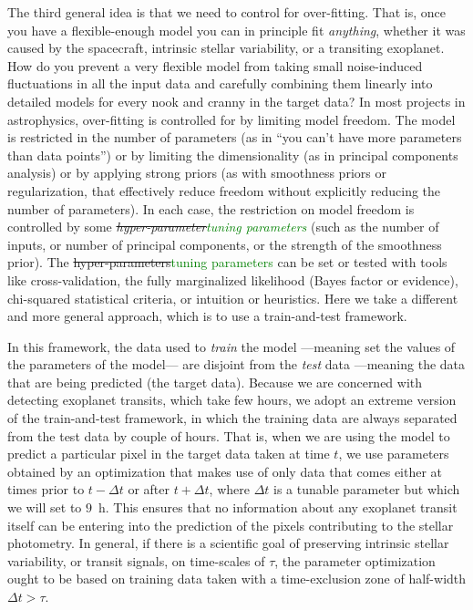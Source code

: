 \documentclass[12pt, preprint]{aastex}
\newcommand{\revise}[1]{\textcolor{green}{#1}}
\newcommand{\remove}[1]{\sout{#1}}
\begin{document}
The third general idea is that we need to control for over-fitting.
That is, once you have a flexible-enough model you can in principle fit \emph{anything},
  whether it was caused by the spacecraft, intrinsic stellar variability, or a transiting exoplanet.
How do you prevent a very flexible model from taking small noise-induced fluctuations in all the input data
  and carefully combining them linearly into detailed models for every nook and cranny in the target data?
In most projects in astrophysics, over-fitting is controlled for by limiting model freedom.
The model is restricted in the number of parameters
  (as in ``you can't have more parameters than data points'')
  or by limiting the dimensionality
  (as in principal components analysis)
  or by applying strong priors
  (as with smoothness priors or regularization, 
  that effectively reduce freedom without explicitly reducing the number of parameters).
In each case, the restriction on model freedom is controlled by some \emph{\remove{hyper-parameter}\revise{tuning parameters}}
  (such as the number of inputs, or number of principal components, or the strength of the smoothness prior).
The \remove{hyper-parameters}\revise{tuning parameters} can be set or tested with tools like cross-validation,
  the fully marginalized likelihood (Bayes factor or evidence),
  chi-squared statistical criteria,
  or intuition or heuristics.
Here we take a different and more general approach, which is to use a train-and-test framework.

In this framework, the data used to \emph{train} the model%
  ---meaning set the values of the parameters of the model---%
  are disjoint from the \emph{test} data
  ---meaning the data that are being predicted (the target data).
Because we are concerned with detecting exoplanet transits,
  which take few hours,
  we adopt an extreme version of the train-and-test framework,
  in which the training data are always separated from the test data by couple of hours.
That is, when we are using the model to predict a particular pixel in the target data taken at time $t$,
  we use parameters obtained by an optimization that makes use of only data
  that comes either at times prior to $t-\Delta t$ or after $t+\Delta t$,
  where $\Delta t$ is a tunable parameter but which we will set to $9$~h.
This ensures that no information about any exoplanet transit itself
  can be entering into the prediction of the pixels contributing to the stellar photometry.
In general, if there is a scientific goal of preserving intrinsic stellar variability,
  or transit signals,
  on time-scales of $\tau$,
  the parameter optimization ought to be based on training data taken with a time-exclusion zone of half-width $\Delta t > \tau$.
\end{document}
